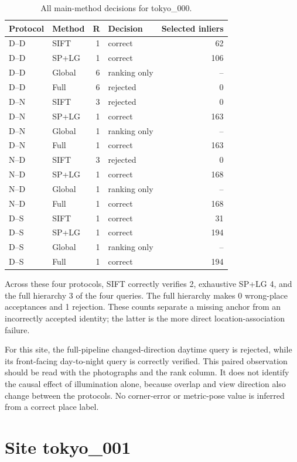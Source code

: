 \begin{table}[H]\centering\small
\caption{All main-method decisions for tokyo\_000.}\label{tab:tokyo-site-0}
\begin{tabular}{llrlr}\toprule
Protocol & Method & R & Decision & Selected inliers \\
\midrule
D--D & SIFT & 1 & correct & 62 \\
D--D & SP+LG & 1 & correct & 106 \\
D--D & Global & 6 & ranking only & -- \\
D--D & Full & 6 & rejected & 0 \\
D--N & SIFT & 3 & rejected & 0 \\
D--N & SP+LG & 1 & correct & 163 \\
D--N & Global & 1 & ranking only & -- \\
D--N & Full & 1 & correct & 163 \\
N--D & SIFT & 3 & rejected & 0 \\
N--D & SP+LG & 1 & correct & 168 \\
N--D & Global & 1 & ranking only & -- \\
N--D & Full & 1 & correct & 168 \\
D--S & SIFT & 1 & correct & 31 \\
D--S & SP+LG & 1 & correct & 194 \\
D--S & Global & 1 & ranking only & -- \\
D--S & Full & 1 & correct & 194 \\
\bottomrule\end{tabular}\end{table}


Across these four protocols, SIFT correctly verifies 2, exhaustive SP+LG 4, and the full hierarchy 3 of the four queries. The full hierarchy makes 0 wrong-place acceptances and 1 rejection. These counts separate a missing anchor from an incorrectly accepted identity; the latter is the more direct location-association failure.

For this site, the full-pipeline changed-direction daytime query is rejected, while its front-facing day-to-night query is correctly verified. This paired observation should be read with the photographs and the rank column. It does not identify the causal effect of illumination alone, because overlap and view direction also change between the protocols. No corner-error or metric-pose value is inferred from a correct place label.

\section{Site tokyo\_001}

